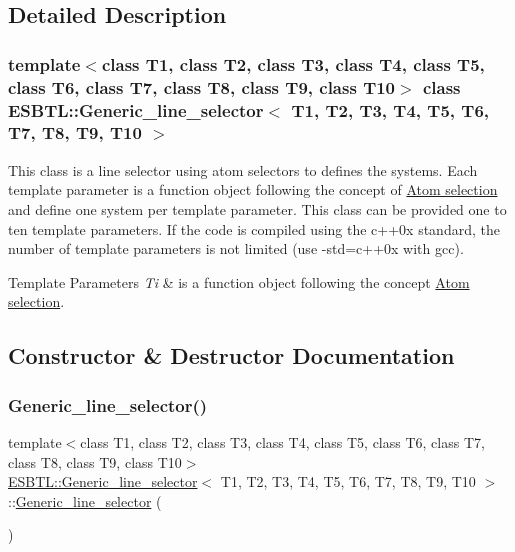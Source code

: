 \subsection{Detailed Description}
\subsubsection*{template$<$class T1, class T2, class T3, class T4, class T5, class T6, class T7, class T8, class T9, class T10$>$\newline
class E\+S\+B\+T\+L\+::\+Generic\+\_\+line\+\_\+selector$<$ T1, T2, T3, T4, T5, T6, T7, T8, T9, T10 $>$}

This class is a line selector using atom selectors to defines the systems. Each template parameter is a function object following the concept of \hyperlink{group__atomsel}{Atom selection} and define one system per template parameter. This class can be provided one to ten template parameters. If the code is compiled using the c++0x standard, the number of template parameters is not limited (use -\/std=c++0x with gcc). 
\begin{DoxyTemplParams}{Template Parameters}
{\em Ti} & is a function object following the concept \hyperlink{group__atomsel}{Atom selection}. \\
\hline
\end{DoxyTemplParams}


\subsection{Constructor \& Destructor Documentation}
\mbox{\label{classESBTL_1_1Generic__line__selector_a7323ec53a256a6b6d96d47381f13bc96}} 
\subsubsection{\texorpdfstring{Generic\+\_\+line\+\_\+selector()}{Generic\_line\_selector()}\hspace{0.1cm}{\footnotesize\ttfamily [1/2]}}
{\footnotesize\ttfamily template$<$class T1, class T2, class T3, class T4, class T5, class T6, class T7, class T8, class T9, class T10$>$ \\
\hyperlink{classESBTL_1_1Generic__line__selector}{E\+S\+B\+T\+L\+::\+Generic\+\_\+line\+\_\+selector}$<$ T1, T2, T3, T4, T5, T6, T7, T8, T9, T10 $>$\+::\hyperlink{classESBTL_1_1Generic__line__selector}{Generic\+\_\+line\+\_\+selector} (\begin{DoxyParamCaption}{ }\end{DoxyParamCaption})\hspace{0.3cm}{\ttfamily [inline]}}

